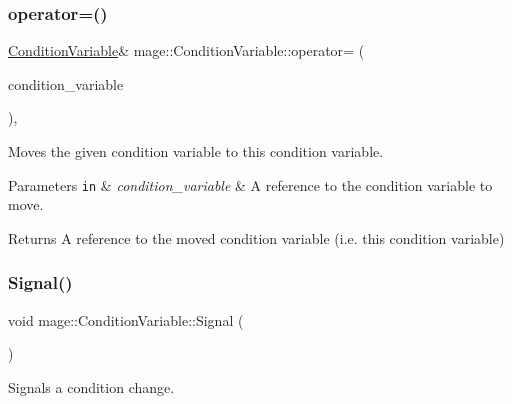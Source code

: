 \subsubsection{\texorpdfstring{operator=()}{operator=()}\hspace{0.1cm}{\footnotesize\ttfamily [2/2]}}
{\footnotesize\ttfamily \hyperlink{classmage_1_1_condition_variable}{Condition\+Variable}\& mage\+::\+Condition\+Variable\+::operator= (\begin{DoxyParamCaption}\item[{\hyperlink{classmage_1_1_condition_variable}{Condition\+Variable} \&\&}]{condition\+\_\+variable }\end{DoxyParamCaption})\hspace{0.3cm}{\ttfamily [default]}, {\ttfamily [noexcept]}}

Moves the given condition variable to this condition variable.


\begin{DoxyParams}[1]{Parameters}
\mbox{\tt in}  & {\em condition\+\_\+variable} & A reference to the condition variable to move. \\
\hline
\end{DoxyParams}
\begin{DoxyReturn}{Returns}
A reference to the moved condition variable (i.\+e. this condition variable) 
\end{DoxyReturn}
\hypertarget{classmage_1_1_condition_variable_ad48673a4f7ea2a28c7ddc77222e5d8cc}{}\label{classmage_1_1_condition_variable_ad48673a4f7ea2a28c7ddc77222e5d8cc} 
\subsubsection{\texorpdfstring{Signal()}{Signal()}}
{\footnotesize\ttfamily void mage\+::\+Condition\+Variable\+::\+Signal (\begin{DoxyParamCaption}{ }\end{DoxyParamCaption})\hspace{0.3cm}{\ttfamily [noexcept]}}

Signals a condition change. \hypertarget{classmage_1_1_condition_variable_a40e853cf65b0c3cb3788d2b8a45448af}{}\label{classmage_1_1_condition_variable_a40e853cf65b0c3cb3788d2b8a45448af} 
